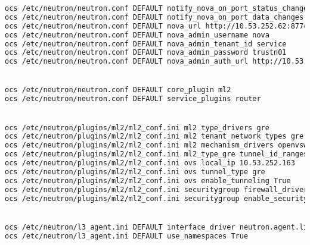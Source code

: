 \documentclass[11pt,letterpaper,oneside]{book}
\begin{document}
\begin{lstlisting}[caption={Neutron virneupaw001},language=bash]
ocs /etc/neutron/neutron.conf DEFAULT notify_nova_on_port_status_changes True
ocs /etc/neutron/neutron.conf DEFAULT notify_nova_on_port_data_changes True
ocs /etc/neutron/neutron.conf DEFAULT nova_url http://10.53.252.62:8774/v2
ocs /etc/neutron/neutron.conf DEFAULT nova_admin_username nova
ocs /etc/neutron/neutron.conf DEFAULT nova_admin_tenant_id service
ocs /etc/neutron/neutron.conf DEFAULT nova_admin_password trustn01
ocs /etc/neutron/neutron.conf DEFAULT nova_admin_auth_url http://10.53.252.61:35357/v2.0


ocs /etc/neutron/neutron.conf DEFAULT core_plugin ml2
ocs /etc/neutron/neutron.conf DEFAULT service_plugins router


ocs /etc/neutron/plugins/ml2/ml2_conf.ini ml2 type_drivers gre
ocs /etc/neutron/plugins/ml2/ml2_conf.ini ml2 tenant_network_types gre
ocs /etc/neutron/plugins/ml2/ml2_conf.ini ml2 mechanism_drivers openvswitch
ocs /etc/neutron/plugins/ml2/ml2_conf.ini ml2_type_gre tunnel_id_ranges 1:1000
ocs /etc/neutron/plugins/ml2/ml2_conf.ini ovs local_ip 10.53.252.163
ocs /etc/neutron/plugins/ml2/ml2_conf.ini ovs tunnel_type gre
ocs /etc/neutron/plugins/ml2/ml2_conf.ini ovs enable_tunneling True
ocs /etc/neutron/plugins/ml2/ml2_conf.ini securitygroup firewall_driver neutron.agent.linux.iptables_firewall.OVSHybridIptablesFirewallDriver
ocs /etc/neutron/plugins/ml2/ml2_conf.ini securitygroup enable_security_group True


ocs /etc/neutron/l3_agent.ini DEFAULT interface_driver neutron.agent.linux.interface.OVSInterfaceDriver
ocs /etc/neutron/l3_agent.ini DEFAULT use_namespaces True
\end{lstlisting}
\end{document}
